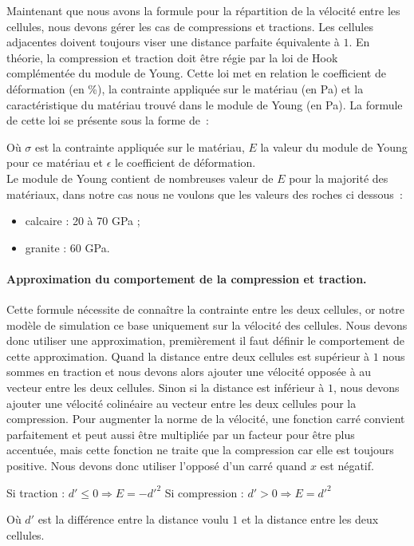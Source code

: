 \documentclass[a4paper,11pt]{article}
\begin{document}
Maintenant que nous avons la formule pour la répartition de la vélocité entre les cellules, nous devons gérer les cas de compressions et tractions.
Les cellules adjacentes doivent toujours viser une distance parfaite équivalente à $1$.
En théorie, la compression et traction doit être régie par la loi de Hook complémentée du module de Young. Cette loi met en relation le coefficient de déformation (en \%), la contrainte appliquée sur le matériau (en Pa) et la caractéristique du matériau trouvé dans le module de Young (en Pa).
La formule de cette loi se présente sous la forme de~:
\begin{center}
\end{center}
Où $\sigma$ est la contrainte appliquée sur le matériau, $E$ la valeur du module de Young pour ce matériau et $\epsilon$ le coefficient de déformation. \\
Le module de Young contient de nombreuses valeur de $E$ pour la majorité des matériaux, dans notre cas nous ne voulons que les valeurs des roches ci dessous~:
\begin{itemize}
  \item calcaire : 20 à 70 GPa ;
  \item granite : 60 GPa.
\end{itemize}


\paragraph{Approximation du comportement de la compression et traction.}

Cette formule nécessite de connaître la contrainte entre les deux cellules, or notre modèle de simulation ce base uniquement sur la vélocité des cellules.
Nous devons donc utiliser une approximation, premièrement il faut définir le comportement de cette approximation.
Quand la distance entre deux cellules est supérieur à $1$ nous sommes en traction et nous devons alors ajouter une vélocité opposée à au vecteur entre les deux cellules.
Sinon si la distance est inférieur à $1$, nous devons ajouter une vélocité colinéaire au vecteur entre les deux cellules pour la compression.
Pour augmenter la norme de la vélocité, une fonction carré convient parfaitement et peut aussi être multipliée par un facteur pour être plus accentuée, mais cette fonction ne traite que la compression car elle est toujours positive.
Nous devons donc utiliser l'opposé d'un carré quand $x$ est négatif.
\medbreak
\begin{center}
  Si traction : $d' \leqslant 0 \Rightarrow E = -d'^2$ \medbreak
  Si compression : $d' > 0 \Rightarrow E = d'^2$
\end{center}
Où $d'$ est la différence entre la distance voulu $1$ et la distance entre les deux cellules. \\
\end{document}
